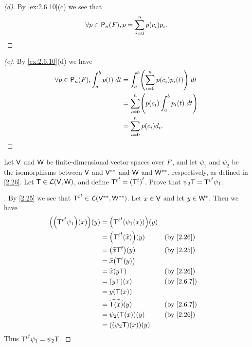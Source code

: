 \begin{proof}[(d)]
  By \cref{ex:2.6.10}(c) we see that
  \[
    \forall p \in \ps[n]{\F}, p = \sum_{i = 0}^n p(c_i) p_i.
  \]
\end{proof}

\begin{proof}[(e)]
  By \cref{ex:2.6.10}(d) we have
  \begin{align*}
    \forall p \in \ps[n]{\F}, \int_a^b p(t) \; dt & = \int_a^b \pa{\sum_{i = 0}^n p(c_i) p_i(t)} \; dt \\
                                                  & = \sum_{i = 0}^n \pa{p(c_i) \int_a^b p_i(t) \; dt} \\
                                                  & = \sum_{i = 0}^n p(c_i) d_i.
  \end{align*}
\end{proof}

\begin{ex}\label{ex:2.6.11}
  Let \(\mathsf{V}\) and \(\mathsf{W}\) be finite-dimensional vector spaces over \(\mathit{F}\), and let \(\psi_1\) and \(\psi_2\) be the isomorphisms between \(\mathsf{V}\) and \(\mathsf{V}^{**}\) and \(\mathsf{W}\) and \(\mathsf{W}^{**}\), respectively, as defined in \cref{2.26}.
  Let \(\mathsf{T} \in \mathcal{L}(\mathsf{V}, \mathsf{W})\), and define \({{\mathsf{T}}^{t}}^{t} = {\left\lparen{\mathsf{T}}^{t}\right\rparen}^{t}\).
  Prove that \(\psi_2 \mathsf{T} = {{\mathsf{T}}^{t}}^{t} \psi_1\).
\end{ex}

\begin{proof}[]
  By \cref{2.25} we see that \({{\mathsf{T}}^{t}}^{t} \in \mathcal{L}(\mathsf{V}^{**}, \mathsf{W}^{**})\).
  Let \(x \in \mathsf{V}\) and let \(y \in \mathsf{W}^*\).
  Then we have
  \begin{align*}
    \pa{\pa{\tp{\tp{\T}} \psi_1}(x)}(y) & = \pa{\tp{\tp{\T}}(\psi_1(x))}(y)                   \\
                                        & = \pa{\tp{\tp{\T}}(\widehat{x})}(y) &  & \by{2.26}  \\
                                        & = \pa{\widehat{x} \tp{\T}}(y)       &  & \by{2.25}  \\
                                        & = \widehat{x}\pa{\tp{\T}(y)}                        \\
                                        & = \widehat{x}(y \T)                 &  & \by{2.26}  \\
                                        & = (y \T)(x)                         &  & \by{2.6.7} \\
                                        & = y(\T(x))                                          \\
                                        & = \widehat{\T(x)}(y)                &  & \by{2.6.7} \\
                                        & = \psi_2(\T(x))(y)                  &  & \by{2.26}  \\
                                        & = ((\psi_2 \T)(x))(y).
  \end{align*}
  Thus \({{\mathsf{T}}^{t}}^{t} \psi_1 = \psi_2 \mathsf{T}\).
\end{proof}

